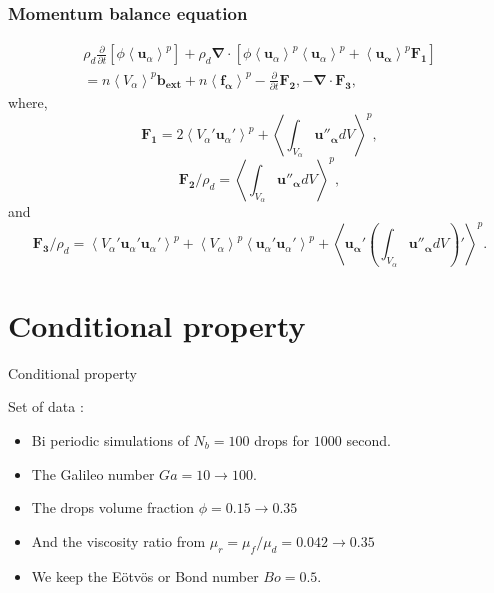 \documentclass[aspectratio=169]{beamer}
\begin{document}
\begin{frame}
  \frametitle{Momentum balance equation}
  \begin{multline}
    \rho_d 
    \frac{\partial }{\partial t}
    \left[
        \phi \left<\bm{u}_\alpha\right>^p
    \right] 
    + \rho_d\bm{\nabla}\cdot
    \left[
        \phi \left<\bm{u}_\alpha\right>^p \left<\bm{u}_\alpha\right>^p
    + \left<\bm{u_\alpha}\right>^p \bm{F_1}
    \right]
    \\= n \left<V_\alpha\right>^p\bm{b_{ext}} 
    + n\left<\bm{f_\alpha}\right>^p
    - \frac{\partial }{\partial t}\bm{F_2},
    - \bm{\nabla}\cdot\bm{F_3},
    \label{eq:particlesAVG}
\end{multline} 
where,
\begin{equation*}
    \bm{F_1}
    = 2\left<V_\alpha'\bm{u}_\alpha'\right>^p
    +  \left<\int_{V_\alpha} \bm{u''_\alpha}dV\right>^p,
\end{equation*} 
\begin{equation*}
    \bm{F_2}/\rho_d
    = \left<\int_{V_\alpha} \bm{u''_\alpha}dV\right>^p,
\end{equation*}
and
\begin{equation*}
    \bm{F_3}/\rho_d
    = \left<V_\alpha' \bm{u}_\alpha'\bm{u}_\alpha'\right>^p
    + \left<V_\alpha\right>^p \left<\bm{u}_\alpha'\bm{u}_\alpha'\right>^p
    +\left<\bm{u_\alpha}'\left(\int_{V_\alpha} \bm{u''_\alpha}dV\right)'\right>^p.
\end{equation*}
  

\end{frame}




















\section*{Conditional property}
\begin{frame}
  \vfill
  \centering
  \Huge{Conditional property}
  \vfill
\end{frame}
\begin{frame}{Set of data :}

  \begin{itemize}
    \item Bi periodic simulations of $N_b = 100$ drops for $1000$ second. 
    \item  The Galileo number $Ga = 10 \rightarrow 100$. 
    \item  The drops volume fraction $\phi = 0.15 \rightarrow 0.35$ 
    \item  And the viscosity ratio from $\mu_r = \mu_f/\mu_d = 0.042 \rightarrow 0.35$ 
    \item  We keep the Eötvös or Bond number $Bo = 0.5$.  
  \end{itemize}
\end{frame}
\end{document}
